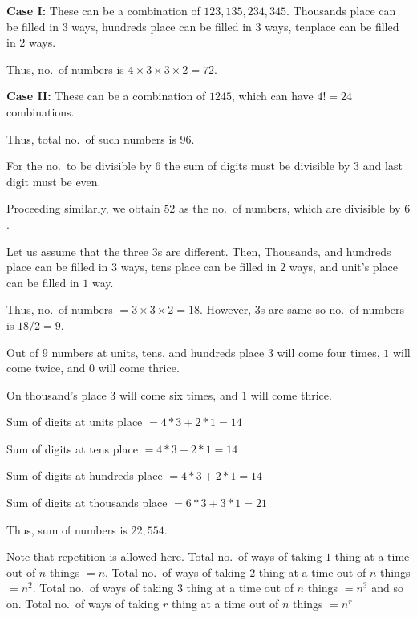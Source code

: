   {\bf Case I:} These can be a combination of $123, 135, 234, 345$. Thousand\symbol[rightquote]s place can be
  filled in $3$ ways, hundred\symbol[rightquote]s place can be filled in $3$ ways, ten\symbol[rightquote]
  place can be filled in $2$ ways.

  Thus, no.\ of numbers is $4\times3\times3\times2 = 72$.

  {\bf Case II:} These can be a combination of $1245$, which can have $4! = 24$ combinations.

  Thus, total no.\ of such numbers is $96$.

  For the no.\ to be divisible by $6$ the sum of digits must be divisible by $3$ and last digit must be even.

  Proceeding similarly, we obtain $52$ as the no.\ of numbers, which are divisible by $6$.
\item Let us assume that the three $3$\symbol[rightquote]s are different. Then, Thousand\symbol[rightquote]s,
  and hundred\symbol[rightquote]s place can be filled in $3$ ways, ten\symbol[rightquote]s place can be
  filled in $2$ ways, and unit's place can be filled in $1$ way.

  Thus, no.\ of numbers $= 3\times3\times2 = 18$. However, $3$\symbol[rightquote]s are same so no.\ of
  numbers is $18/2 = 9$.

  Out of $9$ numbers at unit\symbol[rightquote]s, ten\symbol[rightquote]s, and hundred\symbol[rightquote]s
  place $3$ will come four times, $1$ will come twice, and $0$ will come thrice.

  On thousand's place $3$ will come six times, and $1$ will come thrice.

  Sum of digits at unit\symbol[rightquote]s place $= 4*3 + 2*1 = 14$

  Sum of digits at ten\symbol[rightquote]s place $= 4*3 + 2*1 = 14$

  Sum of digits at hundred\symbol[rightquote]s place $= 4*3 + 2*1 = 14$

  Sum of digits at thousand\symbol[rightquote]s place $= 6*3 + 3*1 = 21$

  Thus, sum of numbers is $22,554$.
\item Note that repetition is allowed here. Total no.\ of ways of taking $1$ thing at a time out of $n$
  things $= n$. Total no.\ of ways of taking $2$ thing at a time out of $n$ things $= n^2$. Total no.\ of ways
  of taking $3$ thing at a time out of $n$ things $= n^3$ and so on. Total no.\ of ways of taking $r$ thing
  at a time out of $n$ things $= n^r$

